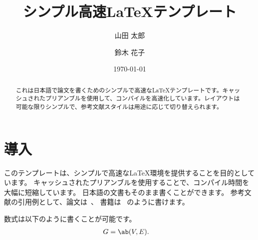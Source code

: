 \documentclass[11pt,uplatex,dvipdfmx,a4paper]{jsarticle}
\title{\textbf{シンプル高速\LaTeX{}テンプレート}}
\author[A]{山田 太郎}
\author[AB]{鈴木 花子}
\affil[A]{東京大学}
\affil[B]{京都大学}
\date{\today}
\begin{document}
\maketitle
\begin{abstract}
これは日本語で論文を書くためのシンプルで高速な\LaTeX{}テンプレートです。キャッシュされたプリアンブルを使用して、コンパイルを高速化しています。レイアウトは可能な限りシンプルで、参考文献スタイルは用途に応じて切り替えられます。
\end{abstract}

\section{導入}

このテンプレートは、シンプルで高速な\LaTeX{}環境を提供することを目的としています。
キャッシュされたプリアンブルを使用することで、コンパイル時間を大幅に短縮しています。
日本語の文書もそのまま書くことができます。
参考文献の引用例として、論文は~\cite{einstein1905}、
書籍は~\cite{lamport1994} のように書けます。

数式は以下のように書くことが可能です。
\begin{align}
G &= \ab(V, E).
\end{align}


\end{document}
